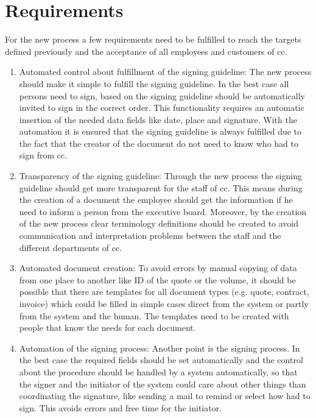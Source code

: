 \section{Requirements}
For the new process a few requirements need to be fulfilled to reach the targets defined previously and the acceptance of all employees and customers of \gls{cc}.
\begin{enumerate}
	 \item Automated control about fulfillment of the signing guideline: \newline
	 The new process should make it simple to fulfill the signing guideline. In the best case all persons need to sign, based on the signing guideline should be automatically invited to sign in the correct order. This functionality requires an automatic insertion of the needed data fields like date, place and signature. With the automation it is ensured that the signing guideline is always fulfilled due to the fact that the creator of the document do not need to know who had to sign from \gls{cc}.
	 \item Transparency of the signing guideline: \newline
	 Through the new process the signing guideline should get more transparent for the staff of \gls{cc}. This means during the creation of a document the employee should get the information if he need to inform a person from the executive board. Moreover, by the creation of the new process clear terminology definitions should be created to avoid communication and interpretation problems between the staff and the different departments of \gls{cc}.
	 \item Automated document creation: \newline 
	 To avoid errors by manual copying of data from one place to another like ID of the quote or the volume, it should be possible that there are templates for all document types (e.g. quote, contract, invoice) which could be filled in simple cases direct from the system or partly from the system and the human. The templates need to be created with people that know the needs for each document.
	 \item Automation of the signing process: \newline
	 Another point is the signing process. In the best case the required fields should be set automatically and the control about the  procedure should be handled by a system automatically, so that the signer and the initiator of the system could care about other things than coordinating the signature, like sending a mail to remind or select how had to sign. This avoids errors and free time for the initiator.

\end{enumerate}

